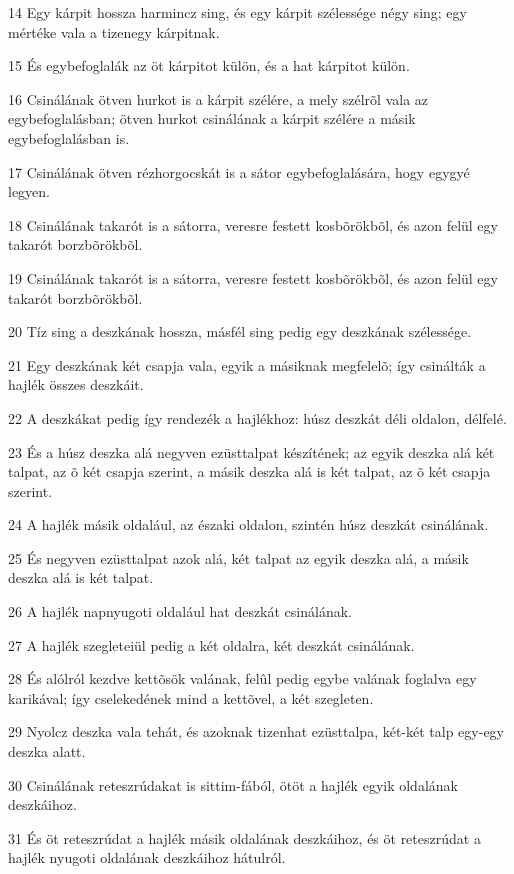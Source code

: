 \par 14 Egy kárpit hossza harmincz sing, és egy kárpit szélessége négy sing; egy mértéke vala a tizenegy kárpitnak.
\par 15 És egybefoglalák az öt kárpitot külön, és a hat kárpitot külön.
\par 16 Csinálának ötven hurkot is a kárpit szélére, a mely szélrõl vala az egybefoglalásban; ötven hurkot csinálának a kárpit szélére a másik egybefoglalásban is.
\par 17 Csinálának ötven rézhorgocskát is a sátor egybefoglalására, hogy egygyé legyen.
\par 18 Csinálának takarót is a sátorra, veresre festett kosbõrökbõl, és azon felül egy takarót borzbõrökbõl.
\par 19 Csinálának takarót is a sátorra, veresre festett kosbõrökbõl, és azon felül egy takarót borzbõrökbõl.
\par 20 Tíz sing a deszkának hossza, másfél sing pedig egy deszkának szélessége.
\par 21 Egy deszkának két csapja vala, egyik a másiknak megfelelõ; így csinálták a hajlék összes deszkáit.
\par 22 A deszkákat pedig így rendezék a hajlékhoz: húsz deszkát déli oldalon, délfelé.
\par 23 És a húsz deszka alá negyven ezüsttalpat készítének; az egyik deszka alá két talpat, az õ két csapja szerint, a másik deszka alá is két talpat, az õ két csapja szerint.
\par 24 A hajlék másik oldalául, az északi oldalon, szintén húsz deszkát csinálának.
\par 25 És negyven ezüsttalpat azok alá, két talpat az egyik deszka alá, a másik deszka alá is két talpat.
\par 26 A hajlék napnyugoti oldalául hat deszkát csinálának.
\par 27 A hajlék szegleteiül pedig a két oldalra, két deszkát csinálának.
\par 28 És alólról kezdve kettõsök valának, felûl pedig egybe valának foglalva egy karikával; így cselekedének mind a kettõvel, a két szegleten.
\par 29 Nyolcz deszka vala tehát, és azoknak tizenhat ezüsttalpa, két-két talp egy-egy deszka alatt.
\par 30 Csinálának reteszrúdakat is sittim-fából, ötöt a hajlék egyik oldalának deszkáihoz.
\par 31 És öt reteszrúdat a hajlék másik oldalának deszkáihoz, és öt reteszrúdat a hajlék nyugoti oldalának deszkáihoz hátulról.
